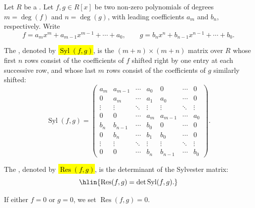\begin{definition} \label{definition:resultant_of_two_polynomials_over_a_commutative_ring}
    Let $R$ be a . Let $f, g \in R[x]$ be two non-zero polynomials of degrees $m = \deg(f)$ and $n = \deg(g)$, with leading coefficients $a_m$ and $b_n$, respectively. Write
    $$ f = a_m x^m + a_{m-1} x^{m-1} + \cdots + a_0, \qquad g = b_n x^n + b_{n-1} x^{n-1} + \cdots + b_0. $$

    The , denoted by \hl{$\operatorname{Syl}(f,g)$}, is the $(m+n) \times (m+n)$ matrix over $R$ whose first $n$ rows consist of the coefficients of $f$ shifted right by one entry at each successive row, and whose last $m$ rows consist of the coefficients of $g$ similarly shifted:
    $$
    \operatorname{Syl}(f,g) =
    \begin{pmatrix}
        a_m & a_{m-1} & \cdots & a_0 & 0 & \cdots & 0 \\
        0 & a_m & \cdots & a_1 & a_0 & \cdots & 0 \\
        \vdots & \vdots & \ddots & \vdots & \vdots & \ddots & \vdots \\
        0 & 0 & \cdots & a_m & a_{m-1} & \cdots & a_0 \\
        b_n & b_{n-1} & \cdots & b_0 & 0 & \cdots & 0 \\
        0 & b_n & \cdots & b_1 & b_0 & \cdots & 0 \\
        \vdots & \vdots & \ddots & \vdots & \vdots & \ddots & \vdots \\
        0 & 0 & \cdots & b_n & b_{n-1} & \cdots & b_0
    \end{pmatrix}.
    $$

    The , denoted by \hl{$\operatorname{Res}(f,g)$}, is the determinant of the Sylvester matrix:
    $$ \hlin{\operatorname{Res}(f,g) = \det \operatorname{Syl}(f,g).} $$

    If either $f = 0$ or $g = 0$, we set $\operatorname{Res}(f,g) = 0$.
\end{definition}

